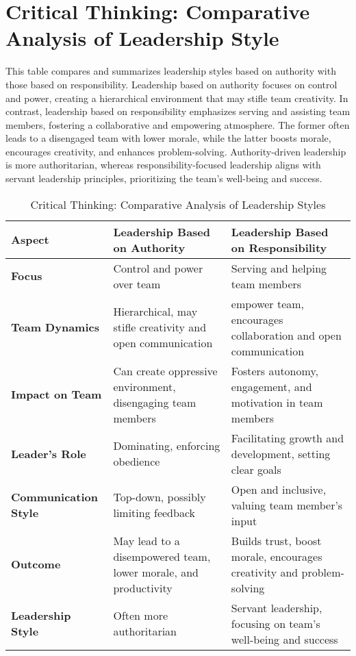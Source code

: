 \documentclass[runningheads]{llncs}
\begin{document}
\section{Critical Thinking: Comparative Analysis of Leadership Style}

This table compares and summarizes leadership styles based on authority with those based on responsibility. Leadership based on authority focuses on control and power, creating a hierarchical environment that may stifle team creativity. In contrast, leadership based on responsibility emphasizes serving and assisting team members, fostering a collaborative and empowering atmosphere. The former often leads to a disengaged team with lower morale, while the latter boosts morale, encourages creativity, and enhances problem-solving. Authority-driven leadership is more authoritarian, whereas responsibility-focused leadership aligns with servant leadership principles, prioritizing the team's well-being and success.
\begin{table}[h]
\centering
\caption{Critical Thinking: Comparative Analysis of Leadership Styles}
\begin{tabularx}{\textwidth}{|@{\hspace{2mm}}X|@{\hspace{2mm}}X@{\hspace{2mm}}|@{\hspace{2mm}}X@{\hspace{2mm}}|}
\hline
\textbf{Aspect} & \textbf{Leadership Based on Authority} & \textbf{Leadership Based on Responsibility} \\ \hline
\textbf{Focus} & Control and power over team & Serving and helping team members \\ \hline
\textbf{Team Dynamics} & Hierarchical, may stifle creativity and open communication & empower team, encourages collaboration and open communication \\ \hline
\textbf{Impact on Team} & Can create oppressive environment, disengaging team members & Fosters autonomy, engagement, and motivation in team members \\ \hline
\textbf{Leader's Role} & Dominating, enforcing obedience & Facilitating growth and development, setting clear goals \\ \hline
\textbf{Communication Style} & Top-down, possibly limiting feedback & Open and inclusive, valuing team member’s input \\ \hline
\textbf{Outcome} & May lead to a disempowered team, lower morale, and productivity & Builds trust, boost morale, encourages creativity and problem-solving \\ \hline
\textbf{Leadership Style} & Often more authoritarian & Servant leadership, focusing on team's well-being and success \\ \hline
\end{tabularx}
\end{table}
\end{document}
